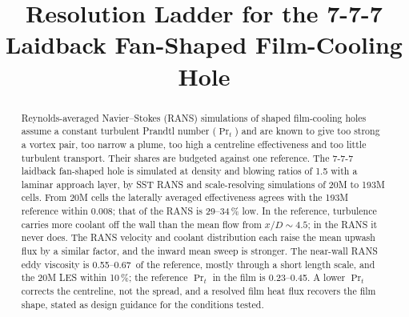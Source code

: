 \documentclass[colorlinks,upint,subscriptcorrection,varvw,hyphenate,balance,lineno]{asmeconf}
\newcommand*{\muNearLow}{0.55}%
\newcommand*{\muNearHigh}{0.67}%
\begin{document}

\title{Resolution Ladder for the 7-7-7 Laidback Fan-Shaped Film-Cooling Hole}%



\maketitle



\begin{abstract}
Reynolds-averaged Navier--Stokes (RANS) simulations of shaped film-cooling holes assume a constant turbulent
Prandtl number ($\Pr_t$) and are known to give too strong a vortex pair, too narrow a plume, too high a
centreline effectiveness and too little turbulent transport. Their shares are budgeted against one reference.
The 7-7-7 laidback fan-shaped hole is simulated at density and blowing ratios of 1.5 with a laminar approach
layer, by SST RANS and scale-resolving simulations of 20M to 193M cells. From 20M
cells the laterally averaged effectiveness agrees with the 193M reference within 0.008; that of the RANS is
29--34\,\% low. In the reference, turbulence carries more coolant off the wall than the mean flow from
$x/D\sim4.5$; in the RANS it never does. The RANS velocity and coolant distribution each raise the mean upwash
flux by a similar factor, and the inward mean sweep is stronger. The near-wall RANS eddy viscosity is
\muNearLow--\muNearHigh\ of the reference, mostly through a short length scale, and the 20M LES within 10\,\%; the
reference $\Pr_t$ in the film is 0.23--0.45. A lower $\Pr_t$ corrects the centreline, not the spread, and a
resolved film heat flux recovers the film shape, stated as design guidance for the conditions tested.
\end{abstract}
\end{document}
